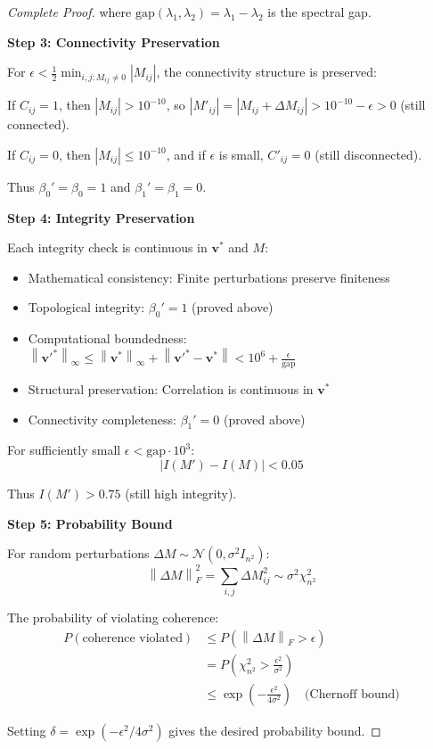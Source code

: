 \documentclass[11pt,a4paper]{article}
\theoremstyle{definition}
\theoremstyle{remark}
\newcommand{\norm}[1]{\left\|#1\right\|}
\newcommand{\abs}[1]{\left|#1\right|}
\newcommand{\gap}{\text{gap}}
\begin{document}
\begin{proof}[Complete Proof]
where $\gap(\lambda_1, \lambda_2) = \lambda_1 - \lambda_2$ is the spectral gap.

\textbf{Step 3: Connectivity Preservation}

For $\epsilon < \frac{1}{2}\min_{i,j: M_{ij} \neq 0} \abs{M_{ij}}$, the connectivity structure is preserved:

If $C_{ij} = 1$, then $\abs{M_{ij}} > 10^{-10}$, so $\abs{M'_{ij}} = \abs{M_{ij} + \Delta M_{ij}} > 10^{-10} - \epsilon > 0$ (still connected).

If $C_{ij} = 0$, then $\abs{M_{ij}} \leq 10^{-10}$, and if $\epsilon$ is small, $C'_{ij} = 0$ (still disconnected).

Thus $\beta_0' = \beta_0 = 1$ and $\beta_1' = \beta_1 = 0$.

\textbf{Step 4: Integrity Preservation}

Each integrity check is continuous in $\mathbf{v}^*$ and $M$:

\begin{itemize}
\item Mathematical consistency: Finite perturbations preserve finiteness
\item Topological integrity: $\beta_0' = 1$ (proved above)
\item Computational boundedness: $\norm{\mathbf{v}'^*}_\infty \leq \norm{\mathbf{v}^*}_\infty + \norm{\mathbf{v}'^* - \mathbf{v}^*} < 10^6 + \frac{\epsilon}{\gap}$
\item Structural preservation: Correlation is continuous in $\mathbf{v}^*$
\item Connectivity completeness: $\beta_1' = 0$ (proved above)
\end{itemize}

For sufficiently small $\epsilon < \gap \cdot 10^3$:
\begin{equation}
\abs{I(M') - I(M)} < 0.05
\end{equation}

Thus $I(M') > 0.75$ (still high integrity).

\textbf{Step 5: Probability Bound}

For random perturbations $\Delta M \sim \mathcal{N}(0, \sigma^2 I_{n^2})$:
\begin{equation}
\norm{\Delta M}_F^2 = \sum_{i,j} \Delta M_{ij}^2 \sim \sigma^2 \chi^2_{n^2}
\end{equation}

The probability of violating coherence:
\begin{align}
P(\text{coherence violated}) &\leq P(\norm{\Delta M}_F > \epsilon) \\
&= P\left(\chi^2_{n^2} > \frac{\epsilon^2}{\sigma^2}\right) \\
&\leq \exp\left(-\frac{\epsilon^2}{4\sigma^2}\right) \quad \text{(Chernoff bound)}
\end{align}

Setting $\delta = \exp(-\epsilon^2 / 4\sigma^2)$ gives the desired probability bound.
\end{proof}
\end{document}
